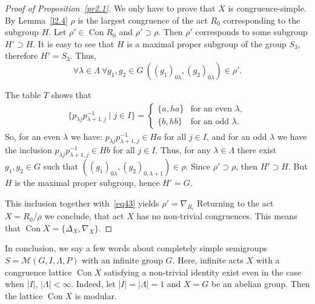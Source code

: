 \documentclass{birkau}
\numberwithin{equation}{section}
\theoremstyle{plain}
\theoremstyle{definition}
\DeclareMathOperator{\Con}{Con}
\begin{document}
\begin{proof}[Proof of Proposition~\ref{pr2.1}]
		We only have to prove that $X$ is congruence-simple. By Lemma~\ref{l2.4} $\rho$ is the largest congruence of the act $R_0$ corresponding to the subgroup $H$. Let $\rho' \in \Con R_0$ and $\rho' \supset \rho$. Then $\rho'$ corresponds to some subgroup $H' \supset H$. It is easy to see that $H$ is a maximal proper subgroup of the group $S_3$, therefore $H' = S_3$. Thus,
		\begin{equation}
		    \forall \lambda \in \Lambda \ \forall g_1,g_2 \in G \ ((g_1)_{0 \lambda},(g_2)_{0 \lambda}) \in \rho'. \label{eq43}
		\end{equation}
		
		The table $T$ shows that
		\begin{gather*}
		\{ p_{\lambda j} p_{\lambda+1,j}^{-1} \mid j \in I \} =
			\begin{cases}
				\{a, ha\} & \text{for an even $\lambda$},\\
				\{b, hb\} & \text{for an odd $\lambda$}.
			\end{cases}
		\end{gather*}
		So, for an even $\lambda$ we have: $p_{\lambda j} p_{\lambda+1,j}^{-1} \in Ha$ for all $j \in I$, and for an odd $\lambda$ we have the inclusion $p_{\lambda j} p_{\lambda+1,j}^{-1} \in Hb$ for all $j \in I$. Thus, for any $\lambda \in \Lambda$ there exist $g_1,g_2 \in G$ such that $((g_1)_{0 \lambda},(g_2)_{0,\lambda+1}) \in \rho$.
		Since $\rho' \supset \rho$, then $H' \supset H$. But $H$ is the maximal proper subgroup, hence $H' = G$.
		
		This inclusion together with~\eqref{eq43} yields $\rho' = \nabla_{R_i}$ Returning to the act $X = {R_0}/{\rho}$ we conclude, that act $X$ has no non-trivial congruences. This means that $\Con X = \{ \Delta_X,\nabla_X \}$.
	\end{proof}
	
	In conclusion, we say a few words about completely simple semigroups $S = \mathcal{M}(G,I,\Lambda,P)$ with an infinite group $G$. Here, infinite acts $X$ with a congruence lattice $\Con X$ satisfying a non-trivial identity exist even in the case when $|I|$, $|\Lambda| < \infty$. Indeed, let $|I| = |\Lambda| = 1$ and $X=G$ be an abelian group. Then the lattice $\Con X$ is modular.
	
	
	
\end{document}
